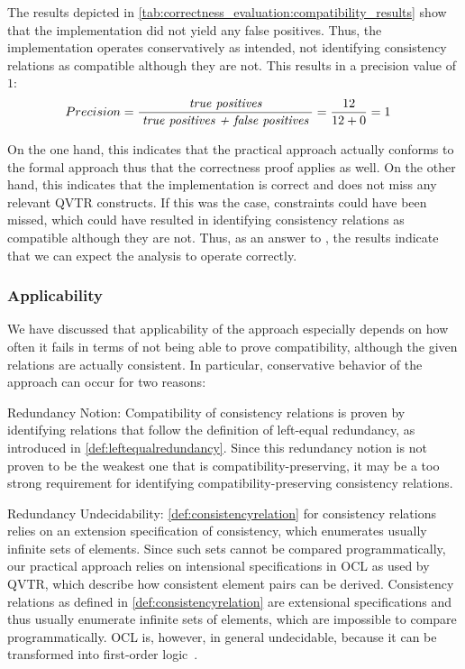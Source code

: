 The results depicted in \autoref{tab:correctness_evaluation:compatibility_results} show that the implementation did not yield any false positives.
Thus, the implementation operates conservatively as intended, not identifying consistency relations as compatible although they are not.
This results in a precision value of $1$:
\begin{align*}
    &
    Precision = \frac{\; \textit{true positives} \;}{\; \textit{true positives + false positives} \;} = \frac{12}{12+0} = 1
\end{align*}

On the one hand, this indicates that the practical approach actually conforms to the formal approach thus that the correctness proof applies as well.
On the other hand, this indicates that the implementation is correct and does not miss any relevant \gls{QVTR} constructs.
If this was the case, constraints could have been missed, which could have resulted in identifying consistency relations as compatible although they are not.
Thus, as an answer to , the results indicate that we can expect the analysis to operate correctly.


\subsubsection{Applicability}

We have discussed that applicability of the approach especially depends on how often it fails in terms of not being able to prove compatibility, although the given relations are actually consistent.
In particular, conservative behavior of the approach can occur for two reasons:
\begin{properdescription}
    \item[Redundancy Notion:] Compatibility of consistency relations is proven by identifying relations that follow the definition of left-equal redundancy, as introduced in \autoref{def:leftequalredundancy}. Since this redundancy notion is not proven to be the weakest one that is compatibility-preserving, it may be a too strong requirement for identifying compatibility-preserving consistency relations.
    \item[Redundancy Undecidability:] \autoref{def:consistencyrelation} for consistency relations relies on an extension specification of consistency, which enumerates usually infinite sets of elements.
    Since such sets cannot be compared programmatically, our practical approach relies on intensional specifications in \gls{OCL} as used by \gls{QVTR}, which describe how consistent element pairs can be derived.
    Consistency relations as defined in \autoref{def:consistencyrelation} are extensional specifications and thus usually enumerate infinite sets of elements, which are impossible to compare programmatically.
    OCL is, however, in general undecidable, because it can be transformed into first-order logic~\cite{beckert2002ocltranslation}.
\end{properdescription}

